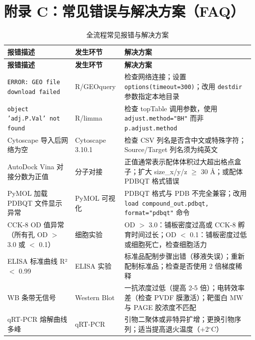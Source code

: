 \documentclass[12pt,a4paper,twoside]{article}
\begin{document}
\section{附录 C：常见错误与解决方案（FAQ）}
\label{appendix:faq}

\begin{longtable}{p{4cm}p{4cm}p{6cm}}
\caption{全流程常见报错与解决方案} \label{tab:faq} \\
\toprule
\textbf{报错描述} & \textbf{发生环节} & \textbf{解决方案} \\
\midrule
\endfirsthead
\toprule
\textbf{报错描述} & \textbf{发生环节} & \textbf{解决方案} \\
\midrule
\endhead
\bottomrule
\endlastfoot
\texttt{ERROR: GEO file download failed} & R/GEOquery & 检查网络连接；设置 \texttt{options(timeout=300)}；改用 \texttt{destdir} 参数指定本地目录 \\
\addlinespace
\texttt{object 'adj.P.Val' not found} & R/limma & 检查 topTable 调用参数，使用 \texttt{adjust.method="BH"} 而非 \texttt{p.adjust.method} \\
\addlinespace
Cytoscape 导入后网络为空 & Cytoscape 3.10.1 & 检查 CSV 列名是否含中文或特殊字符；Source/Target 列名须为纯英文 \\
\addlinespace
AutoDock Vina 对接分数为正值 & 分子对接 & 正值通常表示配体体积过大超出格点盒子；扩大 size\_x/y/z $\geq$ 30 Å；或配体 PDBQT 格式错误 \\
\addlinespace
PyMOL 加载 PDBQT 文件显示异常 & PyMOL 可视化 & PDBQT 格式与 PDB 不完全兼容；改用 \texttt{load compound\_out.pdbqt, format="pdbqt"} 命令 \\
\addlinespace
CCK-8 OD 值异常（所有孔 OD $>$ 3.0 或 $<$ 0.1）& 细胞实验 & OD $>$ 3.0：铺板密度过高或 CCK-8 孵育时间过长；OD $<$ 0.1：铺板密度过低或细胞死亡，检查细胞活力 \\
\addlinespace
ELISA 标准曲线 R² $<$ 0.99 & ELISA 实验 & 标准品配制步骤出错（移液失误）；重新配制标准品；检查是否使用 2 倍梯度稀释 \\
\addlinespace
WB 条带无信号 & Western Blot & 一抗浓度过低（提高 2-5 倍）；电转效率差（检查 PVDF 膜激活）；靶蛋白 MW 与 PAGE 胶浓度不匹配 \\
\addlinespace
qRT-PCR 熔解曲线多峰 & qRT-PCR & 引物二聚体或非特异扩增；更换引物序列；适当提高退火温度（$+$2$^{\circ}$C）\\
\bottomrule
\end{longtable}

\end{document}
